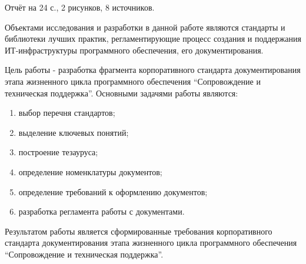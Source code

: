 
\pagebreak
\begin{center}
\end{center}

Отчёт на 24 с., 2 рисунков, 8 источников.


Объектами исследования и разработки в данной работе являются стандарты и библиотеки лучших практик, регламентирующие процесс создания и поддержания ИТ-инфраструктуры программного обеспечения, его документирования.


Цель работы - разработка фрагмента корпоративного стандарта документирования этапа жизненного цикла программного обеспечения \enquote{Сопровождение и техническая поддержка}.
Основными задачями работы являются:
\begin{enumerate}
    \item выбор перечня стандартов;
    \item выделение ключевых понятий;
    \item построение тезауруса;
    \item определение номенклатуры документов;
    \item определение требований к оформлению документов;
    \item разработка регламента работы с документами.
\end{enumerate}

Результатом работы является сформированные требования корпоративного стандарта документирования этапа жизненного цикла программного обеспечения \enquote{Сопровождение и техническая поддержка}.
